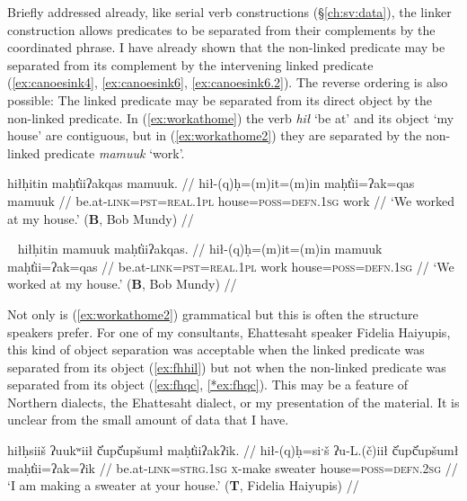 Briefly addressed already, like serial verb constructions (\S\ref{ch:sv:data}), the linker construction allows predicates to be separated from their complements by the coordinated phrase. I have already shown that the non-linked predicate may be separated from its complement by the intervening linked predicate (\ref{ex:canoesink4}, \ref{ex:canoesink6}, \ref{ex:canoesink6.2}). The reverse ordering is also possible: The linked predicate may be separated from its direct object by the non-linked predicate. In (\ref{ex:workathome}) the verb \textit{hił} `be at' and its object `my house' are contiguous, but in (\ref{ex:workathome2}) they are separated by the non-linked predicate \textit{mamuuk} `work'.

\ex \label{ex:workathome}
\begingl
\glpreamble hiłḥitin maḥt̓iiʔakqas mamuuk. //
\gla hił-(q)ḥ=(m)it=(m)in maḥt̓ii=ʔak=qas mamuuk //
\glb be.at-\textsc{link}=\textsc{pst}=\textsc{real.1pl} house=\textsc{poss}=\textsc{defn.1sg} work //
\glft `We worked at my house.' (\textbf{B}, Bob Mundy) //
\endgl
\xe

\ex~ \label{ex:workathome2}
\begingl
\glpreamble hiłḥitin mamuuk maḥt̓iiʔakqas. //
\gla hił-(q)ḥ=(m)it=(m)in mamuuk maḥt̓ii=ʔak=qas //
\glb be.at-\textsc{link}=\textsc{pst}=\textsc{real.1pl} work house=\textsc{poss}=\textsc{defn.1sg} //
\glft `We worked at my house.' (\textbf{B}, Bob Mundy) //
\endgl
\xe

Not only is (\ref{ex:workathome2}) grammatical but this is often the structure speakers prefer. For one of my consultants, Ehattesaht speaker Fidelia Haiyupis, this kind of object separation was acceptable when the linked predicate was separated from its object (\ref{ex:fhhil}) but not when the non-linked predicate was separated from its object (\ref{ex:fhqc}, \ref{*ex:fhqc}). This may be a feature of Northern dialects, the Ehattesaht dialect, or my presentation of the material. It is unclear from the small amount of data that I have. %

\ex \label{ex:fhhil}
\begingl
\glpreamble hiłḥsiiš ʔuukʷiił č̓upč̓upšumł maḥt̓iiʔakʔik. //
\gla hił-(q)ḥ=siˑš ʔu-L.(č)iił č̓upč̓upšumł maḥt̓ii=ʔak=ʔik //
\glb be.at-\textsc{link}=\textsc{strg.1sg} \textsc{x}-make sweater house=\textsc{poss}=\textsc{defn.2sg} //
\glft `I am making a sweater at your house.' (\textbf{T}, Fidelia Haiyupis) //
\endgl
\xe

